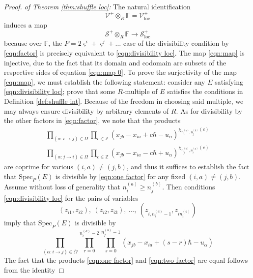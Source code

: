\documentclass{amsart}
\def\BF{{\mathbb{F}}}
\def\BZ{{\mathbb{Z}}}
\def\CS{{\mathcal{S}}}
\def\CV{{\mathcal{V}}}
\def\bs{\boldsymbol{\varsigma}}
\def\edge{\Omega}
\def\ring{R}
\def\field{\BF}
\begin{document}
\medskip 

\begin{proof} \emph{of Theorem \ref{thm:shuffle loc}:} The natural identification
\begin{equation}
\label{eqn:map 0}
\CV^+ \otimes_{\ring} \field = \CV^+_{\text{loc}}
\end{equation}
induces a map
\begin{equation}
\label{eqn:map}
\CS^+ \otimes_{\ring} \field \rightarrow \CS^+_{\text{loc}}
\end{equation}
because over $\field$, the $P = 2\bs^i + \bs^j + \dots$ case of the divisibility condition by \eqref{eqn:factor} is precisely equivalent to \eqref{eqn:divisibility loc}. The map \eqref{eqn:map} is injective, due to the fact that its domain and codomain are subsets of the respective sides of equation \eqref{eqn:map 0}. To prove the surjectivity of the map \eqref{eqn:map}, we must establish the following statement: consider any $E$ satisfying \eqref{eqn:divisibility loc}; prove that some $\ring$-multiple of $E$ satisfies the conditions in Definition \ref{def:shuffle int}. Because of the freedom in choosing said multiple, we may always ensure divisibility by arbitrary elements of $\ring$. As for divisibility by the other factors in \eqref{eqn:factor}, we note that the products
\begin{multline}
\label{eqn:one factor}
\prod_{(\alpha : i \rightarrow j) \in \edge} \prod_{c \in \BZ} \left(x_{jb}-x_{ia}+c\hbar - u_\alpha\right)^{\chi_{n_i^{(a)},n_j^{(b)}}(c)} \\ \prod_{(\alpha : j \rightarrow i) \in \edge} \prod_{c \in \BZ} \left(x_{jb}-x_{ia}-c\hbar + u_\alpha\right)^{\chi_{n_j^{(b)},n_i^{(a)}}(c)}
\end{multline}
are coprime for various $(i,a) \neq (j,b)$, and thus it suffices to establish the fact that $\text{Spec}_P(E)$ is divisible by \eqref{eqn:one factor} for any fixed $(i,a) \neq (j,b)$. Assume without loss of generality that $n_i^{(a)} \geq n_j^{(b)}$. Then conditions \eqref{eqn:divisibility loc} for the pairs of variables 
$$
(z_{i1},z_{i2}), \ (z_{i2},z_{i3}), \ \dots, \ (z_{i,n_i^{(a)}-1},z_{in_i^{(a)}})
$$
imply that $\text{Spec}_P(E)$ is divisible by
\begin{equation}
\label{eqn:two factor}
\prod_{(\alpha : i \rightarrow j) \in \bar{\edge}} \prod_{r=0}^{n_i^{(a)}-2} \prod_{s=0}^{n_j^{(b)}-1} (x_{jb} - x_{ia} + (s-r)\hbar - u_\alpha)
\end{equation}
The fact that the products \eqref{eqn:one factor} and \eqref{eqn:two factor} are equal follows from the identity

\end{proof}
\end{document}

